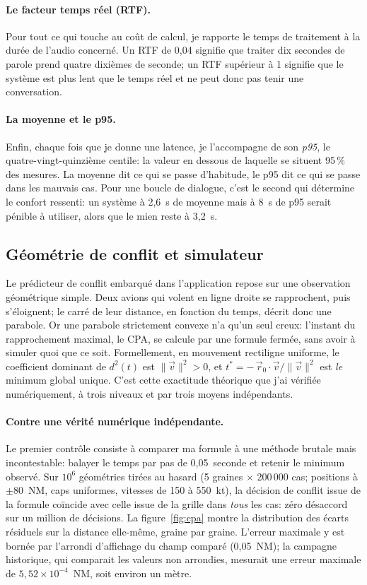 \documentclass[11pt,a4paper]{article}
\begin{document}
\paragraph{Le facteur temps réel (RTF).} Pour tout ce qui touche au coût de calcul, je rapporte le temps de traitement à la durée de l'audio concerné. Un RTF de 0,04 signifie que traiter dix secondes de parole prend quatre dixièmes de seconde; un RTF supérieur à 1 signifie que le système est plus lent que le temps réel et ne peut donc pas tenir une conversation.

\paragraph{La moyenne et le p95.} Enfin, chaque fois que je donne une latence, je l'accompagne de son \emph{p95}, le quatre-vingt-quinzième centile: la valeur en dessous de laquelle se situent 95\,\% des mesures. La moyenne dit ce qui se passe d'habitude, le p95 dit ce qui se passe dans les mauvais cas. Pour une boucle de dialogue, c'est le second qui détermine le confort ressenti: un système à 2,6~s de moyenne mais à 8~s de p95 serait pénible à utiliser, alors que le mien reste à 3,2~s.

\subsection{Géométrie de conflit et simulateur}
\label{sec:res-geo}

Le prédicteur de conflit embarqué dans l'application repose sur une observation géométrique simple. Deux avions qui volent en ligne droite se rapprochent, puis s'éloignent; le carré de leur distance, en fonction du temps, décrit donc une parabole. Or une parabole strictement convexe n'a qu'un seul creux: l'instant du rapprochement maximal, le CPA, se calcule par une formule fermée, sans avoir à simuler quoi que ce soit. Formellement, en mouvement rectiligne uniforme, le coefficient dominant de $d^2(t)$ est $\lVert\vec v\rVert^2 > 0$, et $t^\ast = -\,\vec r_0 \cdot \vec v / \lVert\vec v\rVert^2$ est \emph{le} minimum global unique. C'est cette exactitude théorique que j'ai vérifiée numériquement, à trois niveaux et par trois moyens indépendants.

\paragraph{Contre une vérité numérique indépendante.} Le premier contrôle consiste à comparer ma formule à une méthode brutale mais incontestable: balayer le temps par pas de 0,05~seconde et retenir le minimum observé. Sur $10^6$ géométries tirées au hasard (5 graines $\times$ 200\,000 cas; positions à $\pm$80~NM, caps uniformes, vitesses de 150 à 550~kt), la décision de conflit issue de la formule coïncide avec celle issue de la grille dans \emph{tous} les cas: zéro désaccord sur un million de décisions. La figure~\ref{fig:cpa} montre la distribution des écarts résiduels sur la distance elle-même, graine par graine. L'erreur maximale y est bornée par l'arrondi d'affichage du champ comparé (0,05~NM); la campagne historique, qui comparait les valeurs non arrondies, mesurait une erreur maximale de $5{,}52 \times 10^{-4}$~NM, soit environ un mètre.
\end{document}

